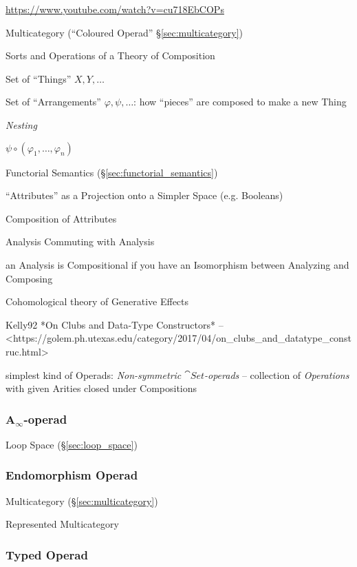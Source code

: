\url{https://www.youtube.com/watch?v=cu718EbCOPs}


Multicategory (``Coloured Operad'' \S\ref{sec:multicategory})

Sorts and Operations of a Theory of Composition

Set of ``Things'' $X,Y,\ldots$

Set of ``Arrangements'' $\varphi,\psi,\ldots$: how ``pieces'' are
composed to make a new Thing

\emph{Nesting}

$\psi \circ (\varphi_1, \ldots, \varphi_n)$

Functorial Semantics (\S\ref{sec:functorial_semantics})

``Attributes'' as a Projection onto a Simpler Space (e.g. Booleans)

Composition of Attributes

Analysis Commuting with Analysis

an Analysis is Compositional if you have an Isomorphism between
Analyzing and Composing

Cohomological theory of Generative Effects


Kelly92 *On Clubs and Data-Type Constructors* --
<https://golem.ph.utexas.edu/category/2017/04/on_clubs_and_datatype_construc.html>

simplest kind of Operads: \emph{Non-symmetric $\cat{Set}$-operads} --
collection of \emph{Operations} with given Arities closed under
Compositions



\subsubsection{A$_\infty$-operad}\label{sec:a_infinity_operad}

Loop Space (\S\ref{sec:loop_space})



\subsubsection{Endomorphism Operad}\label{sec:endomorphism_operad}

Multicategory (\S\ref{sec:multicategory})

Represented Multicategory



\subsubsection{Typed Operad}\label{sec:typed_operad}

